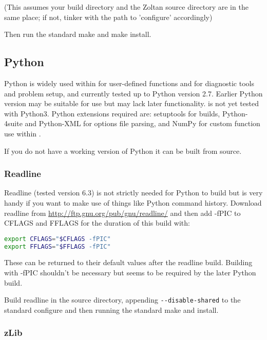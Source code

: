 (This assumes your build directory and the Zoltan source directory are in the
same place; if not, tinker with the path to 'configure' accordingly)

Then run the standard make and make install.

\subsection{Python}
\label{sec:required_libraries_python}

Python is widely used within \fluidity for user-defined functions and for
diagnostic tools and problem setup, and currently tested up to Python version
2.7. Earlier Python version may be suitable for use but may lack later
functionality. \fluidity is not yet tested with Python3. Python extensions
required are: setuptools for \fluidity builds, Python-4suite and Python-XML for
options file parsing, and NumPy for custom function use within \fluidity.

If you do not have a working version of Python it can be built from source. 

\subsubsection{Readline}
\label{sec:required_libraries_python_readline}

Readline (tested version 6.3) is not strictly needed for Python to build but is
very handy if you want to make use of things like Python command history.
Download readline from \url{http://ftp.gnu.org/pub/gnu/readline/} and then add
-fPIC to CFLAGS and FFLAGS for the duration of this build with:

\begin{lstlisting}[language=bash]
export CFLAGS="$CFLAGS -fPIC"
export FFLAGS="$FFLAGS -fPIC"
\end{lstlisting}

These can be returned to their default values after the readline build.
Building with -fPIC shouldn't be necessary but seems to be required by the
later Python build.

Build readline in the source directory, appending
\lstinline[language=bash]+--disable-shared+ to the standard configure and then
running the standard make and install.

\subsubsection{zLib}
\label{sec:required_libraries_python_zlib}

